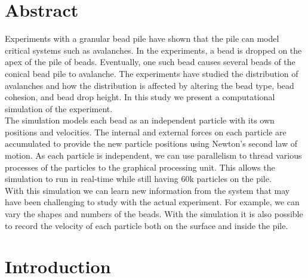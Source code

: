 \documentclass{book}
\begin{document}
\chapter*{Abstract}
\indent Experiments with a granular bead pile have shown that the pile can model critical systems such as avalanches. In the experiments, a bead is dropped on the apex of the pile of beads. Eventually, one such bead causes several beads of the conical bead pile to avalanche. The experiments have studied the distribution of avalanches and how the distribution is affected by altering the bead type, bead cohesion, and bead drop height. In this study we present a computational simulation of the experiment.\\
 \indent The simulation models each bead as an independent particle with its own positions and velocities. The internal and external forces on each particle are accumulated to provide the new particle positions using Newton's second law of motion. As each particle is independent, we can use parallelism to thread various processes of the particles to the graphical processing unit. This allows the simulation to run in real-time while still having $60$k particles on the pile.\\
\indent With this simulation we can learn new information from the system that may have been challenging to study with the actual experiment. For example, we can vary the shapes and numbers of the beads. With the simulation it is also possible to record the velocity of each particle both on the surface and inside the pile. 


\tableofcontents
\setcounter{tocdepth}{2}
\listoftables
\listoffigures

\mainmatter

\chapter{Introduction}\label{introduction}
\end{document}
